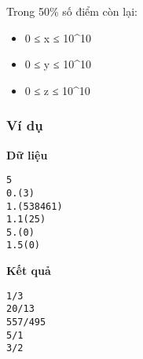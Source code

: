    Trong 50\% số điểm còn lại:  
\begin{itemize}
	\item     0 ≤ x ≤ 10\textasciicircum10   
	\item     0 ≤ y ≤ 10\textasciicircum10   
	\item     0 ≤ z ≤ 10\textasciicircum10   
\end{itemize}

\subsubsection{   Ví dụ  }

\textbf{    Dữ liệu   }
\begin{verbatim}
5
0.(3)
1.(538461)
1.1(25)
5.(0)
1.5(0)
\end{verbatim}

\textbf{    Kết quả   }
\begin{verbatim}
1/3
20/13
557/495
5/1
3/2
\end{verbatim}